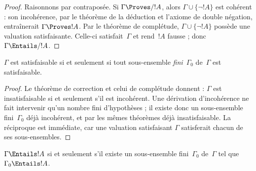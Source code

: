 \documentclass[../../../include/open-logic-section]{subfiles}
\begin{document}
\begin{proof}
Raisonnons par contraposée. Si
$\Gamma\Proves/ !A$, alors
$\Gamma\cup\{\lnot !A\}$ est cohérent :
son incohérence, par le théorème de la déduction
et l'axiome de double négation, entraînerait
$\Gamma\Proves !A$. Par le théorème de complétude,
$\Gamma\cup\{\lnot !A\}$ possède une valuation
satisfaisante. Celle-ci satisfait~$\Gamma$ et
rend~$!A$ fausse ; donc
$\Gamma\Entails/ !A$.
\end{proof}

\begin{prop}
$\Gamma$ est satisfaisable si et seulement si
tout sous-ensemble \emph{fini}~$\Gamma_0$
de~$\Gamma$ est satisfaisable.
\end{prop}

\begin{proof}
Le théorème de correction et celui de complétude
donnent : $\Gamma$ est insatisfaisable si et
seulement s'il est incohérent. Une dérivation
d'incohérence ne fait intervenir qu'un nombre
fini d'hypothèses ; il existe donc un sous-ensemble
fini~$\Gamma_0$ déjà incohérent, et par les mêmes
théorèmes déjà insatisfaisable. La réciproque
est immédiate, car une valuation satisfaisant
$\Gamma$ satisferait chacun de ses sous-ensembles.
\end{proof}

\begin{cor}
$\Gamma\Entails !A$ si et seulement s'il existe
un sous-ensemble fini~$\Gamma_0$ de~$\Gamma$
tel que $\Gamma_0\Entails !A$.
\end{cor}
\end{document}
